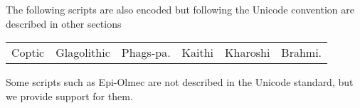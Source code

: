The following scripts are also encoded but following the Unicode
convention are described in other sections

\begin{center}
\begin{tabular}{llllll}
Coptic &Glagolithic &Phags-pa. &Kaithi &Kharoshi &Brahmi.\\
\end{tabular}
\end{center}

Some scripts such as Epi-Olmec are not described in the Unicode standard, but we provide support for them.













%













\ifscriptolmec
  
\fi
